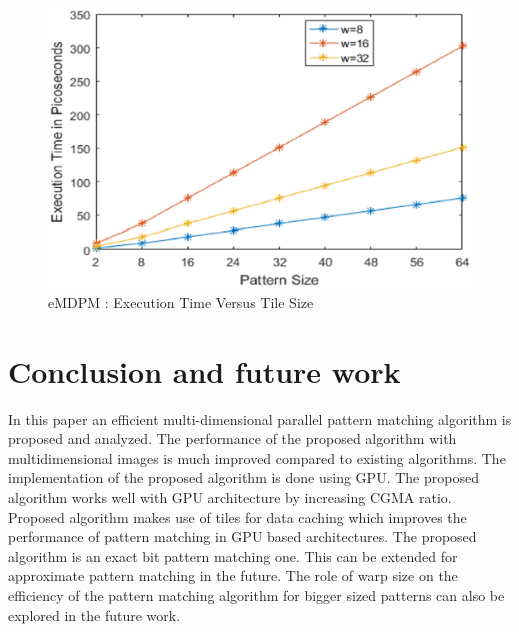 \documentclass[graybox]{svmult}
\begin{document}
\begin{figure}
\sidecaption
\includegraphics[scale=.49]{executiontime.eps}
%
%
\caption{eMDPM : Execution Time Versus Tile Size}
\label{fig:3}       %
\end{figure}

\section{Conclusion and future work}
\label{sec:5}
In this paper an efficient multi-dimensional parallel pattern matching algorithm is proposed and analyzed. The performance of the proposed algorithm with multidimensional images is much improved compared to existing algorithms. The implementation of the proposed algorithm is done using GPU. The proposed algorithm works well with GPU architecture by increasing CGMA ratio. Proposed algorithm makes use of tiles for data caching which improves the performance of pattern matching in GPU based architectures. The proposed algorithm is an exact bit pattern matching one. This can be extended for approximate pattern matching in the future. The role of warp size on the efficiency of the pattern matching algorithm for bigger sized patterns can also be explored in the future work.
\end{document}
